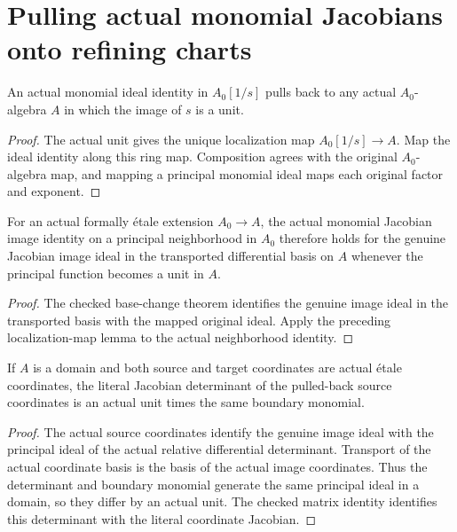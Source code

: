 \section{Pulling actual monomial Jacobians onto refining charts}

\begin{lemma}\label{lem:sc0-principal-monomial-pullback}
\leanok
An actual monomial ideal identity in $A_0[1/s]$ pulls back to any actual
$A_0$-algebra $A$ in which the image of $s$ is a unit.
\end{lemma}
\begin{proof}
The actual unit gives the unique localization map $A_0[1/s]\to A$. Map the
ideal identity along this ring map. Composition agrees with the original
$A_0$-algebra map, and mapping a principal monomial ideal maps each original
factor and exponent.
\end{proof}

\begin{lemma}\label{lem:sc0-jacobian-monomial-pullback}
\leanok
{}
For an actual formally \'etale extension $A_0\to A$, the actual monomial
Jacobian image identity on a principal neighborhood in $A_0$ therefore holds
for the genuine Jacobian image ideal in the transported differential basis
on $A$ whenever the principal function becomes a unit in $A$.
\end{lemma}
\begin{proof}
The checked base-change theorem identifies the genuine image ideal in the
transported basis with the mapped original ideal. Apply the preceding
localization-map lemma to the actual neighborhood identity.
\end{proof}

\begin{lemma}\label{lem:sc0-coordinate-jacobian-unit-monomial}
\leanok
{}
If $A$ is a domain and both source and target coordinates are actual \'etale
coordinates, the literal Jacobian determinant of the pulled-back source
coordinates is an actual unit times the same boundary monomial.
\end{lemma}
\begin{proof}
The actual source coordinates identify the genuine image ideal with the
principal ideal of the actual relative differential determinant. Transport
of the actual coordinate basis is the basis of the actual image coordinates.
Thus the determinant and boundary monomial generate the same principal
ideal in a domain, so they differ by an actual unit. The checked matrix
identity identifies this determinant with the literal coordinate Jacobian.
\end{proof}
